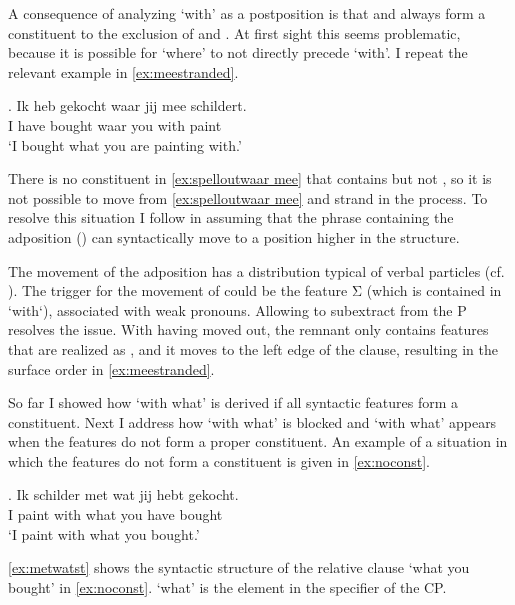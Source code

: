 \documentclass[11pt,a4paper]{article}
\begin{document}
A consequence of analyzing  `with' as a postposition is that  and  always form a constituent to the exclusion of  and . At first sight this seems problematic, because it is possible for  `where' to not directly precede  `with'. I repeat the relevant example in \ref{ex:meestranded}.

\exg. Ik heb gekocht waar jij mee schildert.\\
 I have bought waar you with paint\\
 `I bought what you are painting with.'\label{ex:meestranded}

There is no constituent in \ref{ex:spelloutwaar mee} that contains  but not , so it is not possible to move  from \ref{ex:spelloutwaar mee} and strand  in the process. To resolve this situation I follow \citet{noonan2017dutch} in assuming that the phrase containing the adposition () can syntactically move to a position higher in the structure.

The movement of the adposition has a distribution typical of verbal particles (cf. \citealt{riemsdijk1978,noonan2017dutch}). The trigger for the movement of  could be the feature Σ (which is contained in  `with`), associated with weak pronouns. Allowing  to subextract from the P resolves the issue. With  having moved out, the remnant  only contains features that are realized as , and it moves to the left edge of the clause, resulting in the surface order in \ref{ex:meestranded}.

So far I showed how  `with what' is derived if all syntactic features form a constituent. Next I address how  `with what' is blocked and  `with what' appears when the features do not form a proper constituent. An example of a situation in which the features do not form a constituent is given in \ref{ex:noconst}.

\exg. Ik schilder met wat jij hebt gekocht.\\
 I paint with what you have bought\\
 `I paint with what you bought.'\label{ex:noconst}

\ref{ex:metwatst} shows the syntactic structure of the relative clause  `what you bought' in \ref{ex:noconst}.  `what' is the element in the specifier of the CP.
\end{document}
